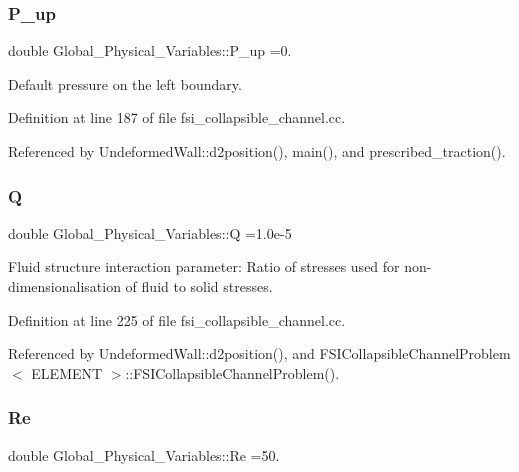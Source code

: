 \subsubsection{\texorpdfstring{P\+\_\+up}{P\_up}}
{\footnotesize\ttfamily double Global\+\_\+\+Physical\+\_\+\+Variables\+::\+P\+\_\+up =0.}



Default pressure on the left boundary. 



Definition at line 187 of file fsi\+\_\+collapsible\+\_\+channel.\+cc.



Referenced by Undeformed\+Wall\+::d2position(), main(), and prescribed\+\_\+traction().

\mbox{\label{namespaceGlobal__Physical__Variables_a66cb7ecda9ba0cd72367dd697f154545}} 
\subsubsection{\texorpdfstring{Q}{Q}}
{\footnotesize\ttfamily double Global\+\_\+\+Physical\+\_\+\+Variables\+::Q =1.\+0e-\/5}



Fluid structure interaction parameter\+: Ratio of stresses used for non-\/dimensionalisation of fluid to solid stresses. 



Definition at line 225 of file fsi\+\_\+collapsible\+\_\+channel.\+cc.



Referenced by Undeformed\+Wall\+::d2position(), and F\+S\+I\+Collapsible\+Channel\+Problem$<$ E\+L\+E\+M\+E\+N\+T $>$\+::\+F\+S\+I\+Collapsible\+Channel\+Problem().

\mbox{\label{namespaceGlobal__Physical__Variables_ab814e627d2eb5bc50318879d19ab16b9}} 
\subsubsection{\texorpdfstring{Re}{Re}}
{\footnotesize\ttfamily double Global\+\_\+\+Physical\+\_\+\+Variables\+::\+Re =50.}



